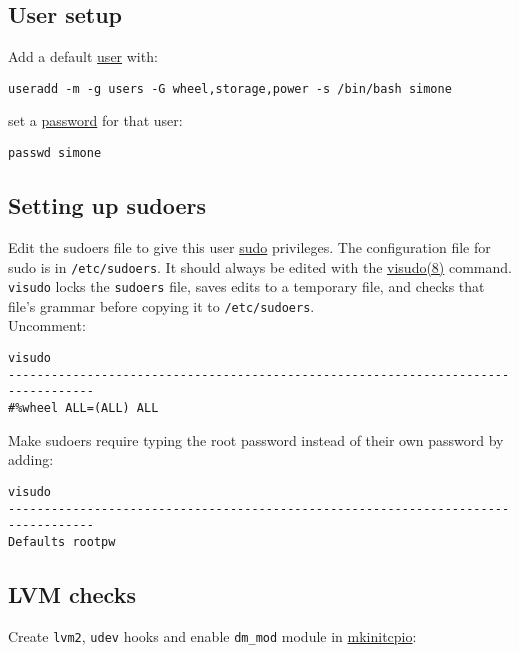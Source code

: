\documentclass[12pt,A4]{article}
\begin{document}
\subsection{User setup} 
Add a default \href{https://wiki.archlinux.org/index.php/Users_and_groups}{user} with:
\begin{verbatim}
useradd -m -g users -G wheel,storage,power -s /bin/bash simone
\end{verbatim}
set a \href{https://wiki.archlinux.org/index.php/Password}{password} for that user:
\begin{verbatim}
passwd simone 
\end{verbatim}

\subsection{Setting up sudoers}
Edit the sudoers file to give this user \href{https://wiki.archlinux.org/index.php/Sudo#Configuration}{sudo} privileges. 
The configuration file for sudo is in \texttt{/etc/sudoers}. It should always be edited with the \href{https://jlk.fjfi.cvut.cz/arch/manpages/man/visudo.8}{visudo(8)} command. \texttt{visudo} locks the \texttt{sudoers} file, saves edits to a temporary file, and checks that file's grammar before copying it to \texttt{/etc/sudoers}.\\
Uncomment:
\begin{verbatim}
visudo
----------------------------------------------------------------------------------
#%wheel ALL=(ALL) ALL
\end{verbatim}
\noindent Make sudoers require typing the root password instead of their own password by adding:
\begin{verbatim}
visudo
----------------------------------------------------------------------------------
Defaults rootpw
\end{verbatim}

\subsection{LVM checks}
Create \texttt{lvm2}, \texttt{udev} hooks and enable \texttt{dm\_mod} module in \href{https://wiki.archlinux.org/index.php/Mkinitcpio}{mkinitcpio}: 
\end{document}
